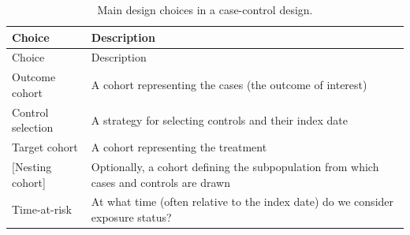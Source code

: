 \documentclass[11pt]{book}
\begin{document}
\begin{longtable}[]{@{}ll@{}}
\caption{\label{tab:ccChoices} Main design choices in a case-control
design.}\tabularnewline
\toprule
\begin{minipage}[b]{0.23\columnwidth}\raggedright\strut
Choice\strut
\end{minipage} & \begin{minipage}[b]{0.71\columnwidth}\raggedright\strut
Description\strut
\end{minipage}\tabularnewline
\midrule
\endfirsthead
\toprule
\begin{minipage}[b]{0.23\columnwidth}\raggedright\strut
Choice\strut
\end{minipage} & \begin{minipage}[b]{0.71\columnwidth}\raggedright\strut
Description\strut
\end{minipage}\tabularnewline
\midrule
\endhead
\begin{minipage}[t]{0.23\columnwidth}\raggedright\strut
Outcome cohort\strut
\end{minipage} & \begin{minipage}[t]{0.71\columnwidth}\raggedright\strut
A cohort representing the cases (the outcome of interest)\strut
\end{minipage}\tabularnewline
\begin{minipage}[t]{0.23\columnwidth}\raggedright\strut
Control selection\strut
\end{minipage} & \begin{minipage}[t]{0.71\columnwidth}\raggedright\strut
A strategy for selecting controls and their index date\strut
\end{minipage}\tabularnewline
\begin{minipage}[t]{0.23\columnwidth}\raggedright\strut
Target cohort\strut
\end{minipage} & \begin{minipage}[t]{0.71\columnwidth}\raggedright\strut
A cohort representing the treatment\strut
\end{minipage}\tabularnewline
\begin{minipage}[t]{0.23\columnwidth}\raggedright\strut
{[}Nesting cohort{]}\strut
\end{minipage} & \begin{minipage}[t]{0.71\columnwidth}\raggedright\strut
Optionally, a cohort defining the subpopulation from which cases and
controls are drawn\strut
\end{minipage}\tabularnewline
\begin{minipage}[t]{0.23\columnwidth}\raggedright\strut
Time-at-risk\strut
\end{minipage} & \begin{minipage}[t]{0.71\columnwidth}\raggedright\strut
At what time (often relative to the index date) do we consider exposure
status?\strut
\end{minipage}\tabularnewline
\bottomrule
\end{longtable}
\end{document}
